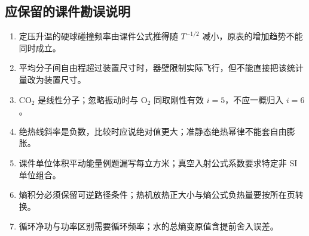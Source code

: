 \documentclass[UTF8,fontset=none,zihao=-4,a4paper]{ctexart}
\begin{document}
\subsection{应保留的课件勘误说明}
\begin{enumerate}
\item 定压升温的硬球碰撞频率由课件公式推得随 $T^{-1/2}$ 减小，原表的增加趋势不能同时成立。
\item 平均分子间自由程超过装置尺寸时，器壁限制实际飞行，但不能直接把该统计量改为装置尺寸。
\item CO$_2$ 是线性分子；忽略振动时与 O$_2$ 同取刚性有效 $i=5$，不应一概归入 $i=6$。
\item 绝热线斜率是负数，比较时应说绝对值更大；准静态绝热幂律不能套自由膨胀。
\item 课件单位体积平动能量例题漏写每立方米；真空入射公式系数要求特定非 SI 单位组合。
\item 熵积分必须保留可逆路径条件；热机放热正大小与熵公式负热量要按所在页转换。
\item 循环净功与功率区别需要循环频率；水的总熵变原值含提前舍入误差。
\end{enumerate}
\end{document}
